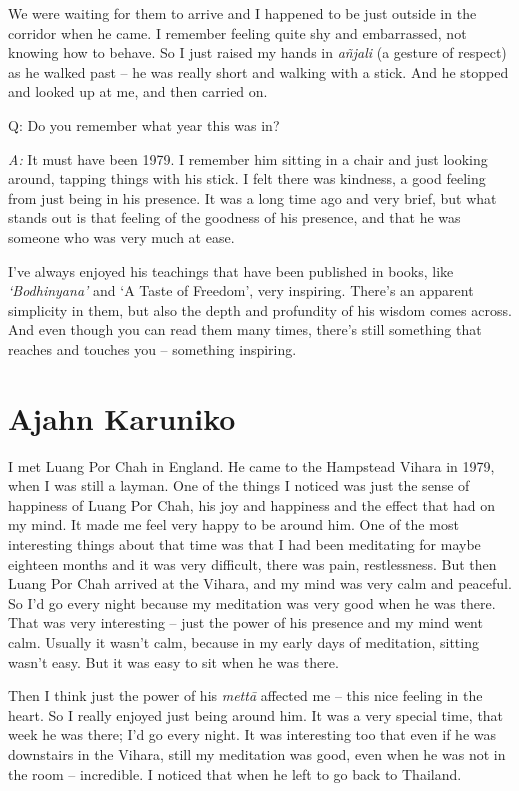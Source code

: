 We were waiting for them to arrive and I happened to be just outside in
the corridor when he came. I remember feeling quite shy and embarrassed,
not knowing how to behave. So I just raised my hands in \emph{añjali} (a
gesture of respect) as he walked past -- he was really short and walking
with a stick. And he stopped and looked up at me, and then carried on.

Q: Do you remember what year this was in?

\emph{A:} It must have been 1979. I remember him sitting in a chair and
just looking around, tapping things with his stick. I felt there was
kindness, a good feeling from just being in his presence. It was a long
time ago and very brief, but what stands out is that feeling of the
goodness of his presence, and that he was someone who was very much at
ease.

I've always enjoyed his teachings that have been published in books,
like \emph{`Bodhinyana'} and `A Taste of Freedom', very inspiring.
There's an apparent simplicity in them, but also the depth and
profundity of his wisdom comes across. And even though you can read them
many times, there's still something that reaches and touches you --
something inspiring.

\section{Ajahn Karuniko}

I met Luang Por Chah in England. He came to the Hampstead Vihara in
1979, when I was still a layman. One of the things I noticed was just
the sense of happiness of Luang Por Chah, his joy and happiness and the
effect that had on my mind. It made me feel very happy to be around him.
One of the most interesting things about that time was that I had been
meditating for maybe eighteen months and it was very difficult, there
was pain, restlessness. But then Luang Por Chah arrived at the Vihara,
and my mind was very calm and peaceful. So I'd go every night because my
meditation was very good when he was there. That was very interesting --
just the power of his presence and my mind went calm. Usually it wasn't
calm, because in my early days of meditation, sitting wasn't easy. But
it was easy to sit when he was there.

Then I think just the power of his \emph{mettā} affected me -- this nice
feeling in the heart. So I really enjoyed just being around him. It was
a very special time, that week he was there; I'd go every night. It was
interesting too that even if he was downstairs in the Vihara, still my
meditation was good, even when he was not in the room -- incredible. I
noticed that when he left to go back to Thailand.

